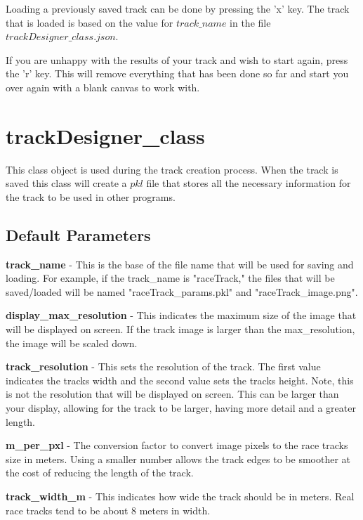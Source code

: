 \documentclass[12pt]{article}
\begin{document}
Loading a previously saved track can be done by pressing the 'x' key. The track that is loaded is based on the value for $track\_name$ in the file $trackDesigner\_class.json$.

If you are unhappy with the results of your track and wish to start again, press the 'r' key. This will remove everything that has been done so far and start you over again with a blank canvas to work with.




\section{trackDesigner\_class}

This class object is used during the track creation process. When the track is saved this class will create a $pkl$ file that stores all the necessary information for the track to be used in other programs.

\subsection{Default Parameters}
\indent\textbf{track\_name} - This is the base of the file name that will be used for saving and loading. For example, if the track\_name is "raceTrack," the files that will be saved/loaded will be named "raceTrack\_params.pkl" and "raceTrack\_image.png".

\indent\textbf{display\_max\_resolution} - This indicates the maximum size of the image that will be displayed on screen. If the track image is larger than the max\_resolution, the image will be scaled down.

\indent\textbf{track\_resolution} - This sets the resolution of the track. The first value indicates the tracks width and the second value sets the tracks height.  Note, this is not the resolution that will be displayed on screen. This can be larger than your display, allowing for the track to be larger, having more detail and a greater length.

\indent\textbf{m\_per\_pxl} - The conversion factor to convert image pixels to the race tracks size in meters. Using a smaller number allows the track edges to be smoother at the cost of reducing the length of the track.

\indent\textbf{track\_width\_m} - This indicates how wide the track should be in meters. Real race tracks tend to be about 8 meters in width.
\end{document}
